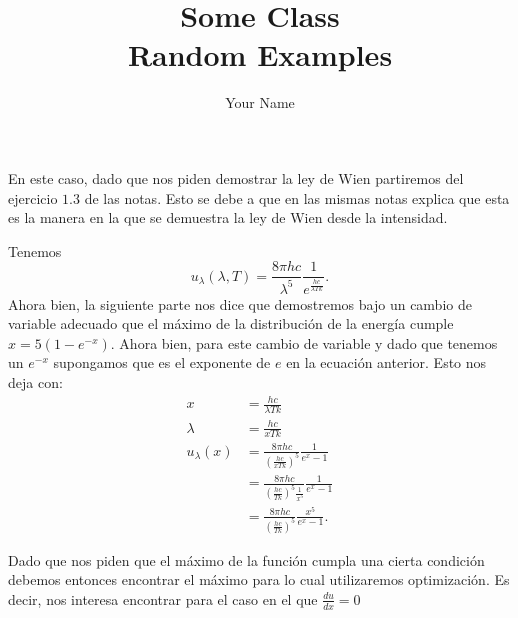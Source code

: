 \documentclass{report}
\title{\Huge{Some Class}\\Random Examples}
\author{\huge{Your Name}}
\date{}
\begin{document}
\maketitle
\newpage%
\tableofcontents
\pagebreak

\chapter{}

\section{}
En este caso, dado que nos piden demostrar la ley de Wien partiremos del ejercicio $1.3$ de las notas. Esto se debe a que en las mismas notas explica que esta es la manera en la que se demuestra la ley de Wien desde la intensidad.

Tenemos  \[
u_{\lambda}\left( \lambda, T \right) = \frac{8\pi h c}{\lambda^{5}} \frac{1}{e^{\frac{hc}{\lambda  Tk }}}
.\] Ahora bien, la siguiente parte nos dice que demostremos bajo un cambio de variable adecuado que el máximo de la distribución de la energía cumple $x = 5\left( 1 - e^{-x} \right) $. Ahora bien, para este cambio de variable y dado que tenemos un $e^{-x}$ supongamos que es el exponente de $e$ en la ecuación anterior. Esto nos deja con:
\begin{align*}
  x &= \frac{hc}{\lambda Tk} \\
  \lambda &= \frac{hc}{x Tk} \\
  u_\lambda\left( x \right) &= \frac{8\pi hc}{\left( \frac{hc}{x Tk} \right)^5} \frac{1}{e^{x} - 1} \\
  &= \frac{8\pi hc}{\left( \frac{hc}{Tk} \right)^{5}\frac{1}{x^{5}}} \frac{1}{e^{x} - 1} \\
  &= \frac{8\pi hc}{\left( \frac{hc}{Tk} \right)^{5}} \frac{x^{5}}{e^{x} - 1}
.\end{align*}

Dado que nos piden que el máximo de la función cumpla una cierta condición debemos entonces encontrar el máximo para lo cual utilizaremos optimización. Es decir, nos interesa encontrar para el caso en el que $\frac{du}{dx} = 0$
\end{document}
